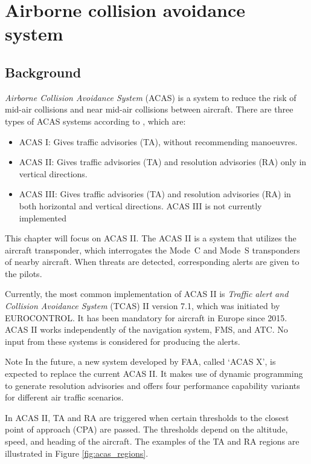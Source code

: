 \chapter{Airborne collision avoidance system} \label{chap:acas}

\section{Background}

\emph{Airborne Collision Avoidance System} (ACAS) is a system to reduce the risk of mid-air collisions and near mid-air collisions between aircraft. There are three types of ACAS systems according to \cite{icaoA10V4}, which are:

\begin{itemize}
  \item ACAS I: Gives traffic advisories (TA), without recommending manoeuvres.
  \item ACAS II: Gives traffic advisories (TA) and resolution advisories (RA) only in vertical directions.
  \item ACAS III: Gives traffic advisories (TA) and resolution advisories (RA) in both horizontal and vertical directions. ACAS III is not currently implemented
\end{itemize}

This chapter will focus on ACAS II. The ACAS II is a system that utilizes the aircraft transponder, which interrogates the Mode~C and Mode~S transponders of nearby aircraft. When threats are detected, corresponding alerts are given to the pilots.

Currently, the most common implementation of ACAS II is \emph{Traffic alert and Collision Avoidance System} (TCAS) II version 7.1, which was initiated by EUROCONTROL. It has been mandatory for aircraft in Europe since 2015. ACAS II works independently of the navigation system, FMS, and ATC. No input from these systems is considered for producing the alerts. 


\begin{notebox}{Note}
In the future, a new system developed by FAA, called `ACAS X', is expected to replace the current ACAS II. It makes use of dynamic programming to generate resolution advisories and offers four performance capability variants for different air traffic scenarios. \cite{chomik2016}
\end{notebox}
  

In ACAS II, TA and RA are triggered when certain thresholds to the closest point of approach (CPA) are passed. The thresholds depend on the altitude, speed, and heading of the aircraft. The examples of the TA and RA regions are illustrated in Figure \ref{fig:acas_regions}.

